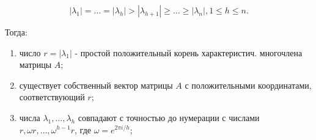 \documentclass[10pt]{article}
\begin{document}
\[
\left|\lambda_{1}\right|=\ldots=\left|\lambda_{h}\right|>\left|\lambda_{h+1}\right| \geqslant \ldots \geqslant\left|\lambda_{n}\right|, 1 \leqslant h \leqslant n .
\]

Тогда:

\begin{enumerate}
  \item число $r=\left|\lambda_{1}\right|$ - простой положительный корень характеристич. многочлена матрицы $A$;

  \item существует собственный вектор матрицы $A$ с положительными координатами, соответствующий $r$;

  \item числа $\lambda_{1}, \ldots, \lambda_{h}$ совпадают с точностью до нумерации с числами $r, \omega r, \ldots, \omega^{h-1} r$, где $\omega=e^{2 \pi i / h}$;

\end{enumerate}
\end{document}
